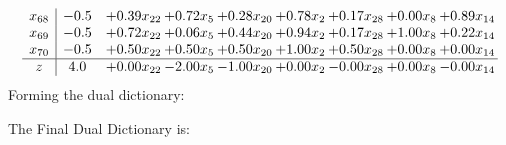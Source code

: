 \documentclass[8pt]{article}
\begin{document}
\[\begin{array}{c| c c@{\hskip 2pt} c@{\hskip 2pt} c@{\hskip 2pt} c@{\hskip 2pt} c@{\hskip 2pt} c@{\hskip 2pt} c@{\hskip 2pt} }
 x_{68}   &  -0.5 & +  0.39 x_{22} & +  0.72 x_{5} & +  0.28 x_{20} & +  0.78 x_{2} & +  0.17 x_{28} & +  0.00 x_{8} & +  0.89 x_{14}\\
 x_{69}   &  -0.5 & +  0.72 x_{22} & +  0.06 x_{5} & +  0.44 x_{20} & +  0.94 x_{2} & +  0.17 x_{28} & +  1.00 x_{8} & +  0.22 x_{14}\\
 x_{70}   &  -0.5 & +  0.50 x_{22} & +  0.50 x_{5} & +  0.50 x_{20} & +  1.00 x_{2} & +  0.50 x_{28} & +  0.00 x_{8} & +  0.00 x_{14}\\
\hline
z    &  4.0 & +  0.00 x_{22} & -2.00 x_{5} & -1.00 x_{20} & +  0.00 x_{2} & -0.00 x_{28} & +  0.00 x_{8} & -0.00 x_{14}\\
\end{array}\]
Forming the dual dictionary:

The Final Dual Dictionary is: 
\end{document}
